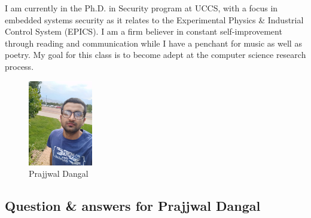 I am currently in the Ph.D. in Security program at UCCS, with a focus in embedded systems security as it relates to the Experimental Physics \& Industrial Control System (EPICS). I am a firm believer in constant self-improvement through reading and communication while I have a penchant for music as well as poetry. My goal for this class is to become adept at the computer science research process.


\begin{figure} [h]
    \captionsetup{justification=centering}
    \centering
    \includegraphics [width= 0.25\textwidth] {Dangal-UCCS}
    \caption{Prajjwal Dangal}
    \label{fig:my_label}
\end{figure}

%

\subsection{Question \& answers for Prajjwal Dangal}


    
    
